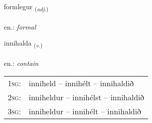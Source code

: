 \documentclass[frontgrid, backgrid]{flacards}\usepackage[]{graphicx}\usepackage[]{xcolor}
\begin{document}
\renewcommand{\flhead}{\vskip5pt \fboxsep=0pt {\small\bfseries\footnotesize Lýsingarorð | Adjective}}
\renewcommand{\fcfoot}{\vskip5pt \fboxsep=0pt \hspace{2pt}{\small\bfseries\footnotesize 2K}}

\renewcommand{\blhead}{\vskip5pt {\small\bfseries\footnotesize Lýsingarorð | Adjective }}
\renewcommand{\bcfoot}{\vskip5pt \hspace{2pt}{\small\bfseries\footnotesize 2K}}


{formlegur \small{\textsubscript{(\textit{adj.})}} \\[1ex] %
\textphonetic{[fɔrmlɛɣʏr]} \\
en.: \emph{formal} \\  [2ex]
\renewcommand*{\arraystretch}{0.8}
}

\renewcommand{\flhead}{\vskip5pt \fboxsep=0pt {\small\bfseries\footnotesize Sagnorð | Verb}}
\renewcommand{\fcfoot}{\vskip5pt \fboxsep=0pt \hspace{2pt}{\small\bfseries\footnotesize 2K}}

\renewcommand{\blhead}{\vskip5pt {\small\bfseries\footnotesize Sagnorð | Verb }}
\renewcommand{\bcfoot}{\vskip5pt \hspace{2pt}{\small\bfseries\footnotesize 2K}}


{innihalda \small{\textsubscript{(\textit{v.})}} \\[1ex] %
\textphonetic{[ɪnɪhalta]} \\
en.: \emph{contain} \\  [2ex]
\renewcommand*{\arraystretch}{0.8}
\begin{tabular}{p{1cm}l}
\textsc{1sg}: & inniheld -- innihélt -- innihaldið \\ 
\textsc{2sg}: & inniheldur -- innihélst -- innihaldið \\ 
\textsc{3sg}: & inniheldur -- innihélt -- innihaldið \\ 
\end{tabular}
}
\end{document}
